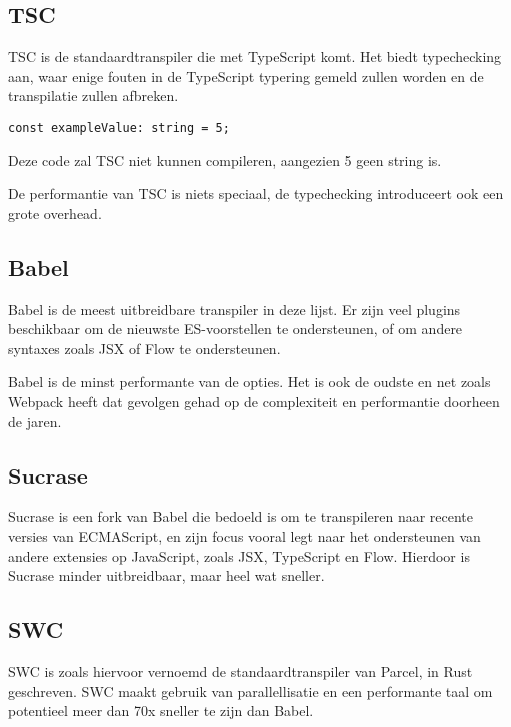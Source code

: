 \subsection{TSC}

TSC is de standaardtranspiler die met TypeScript komt. Het biedt typechecking aan, waar enige fouten in de TypeScript typering gemeld zullen worden en de transpilatie zullen afbreken.

\begin{lstlisting}
const exampleValue: string = 5;
\end{lstlisting}

Deze code zal TSC niet kunnen compileren, aangezien 5 geen string is.

De performantie van TSC is niets speciaal, de typechecking introduceert ook een grote overhead.

\subsection{Babel}

Babel is de meest uitbreidbare transpiler in deze lijst. Er zijn veel plugins beschikbaar om de nieuwste ES-voorstellen te ondersteunen, of om andere syntaxes zoals JSX of Flow te ondersteunen.

Babel is de minst performante van de opties. Het is ook de oudste en net zoals Webpack heeft dat gevolgen gehad op de complexiteit en performantie doorheen de jaren. 

\subsection{Sucrase}

Sucrase is een fork van Babel die bedoeld is om te transpileren naar recente versies van ECMAScript, en zijn focus vooral legt naar het ondersteunen van andere extensies op JavaScript, zoals JSX, TypeScript en Flow. Hierdoor is Sucrase minder uitbreidbaar, maar heel wat sneller. \autocite{pierce}

\subsection{SWC}

SWC is zoals hiervoor vernoemd de standaardtranspiler van Parcel, in Rust geschreven. SWC maakt gebruik van parallellisatie en een performante taal om potentieel meer dan 70x sneller te zijn dan Babel. \autocite{swc}

